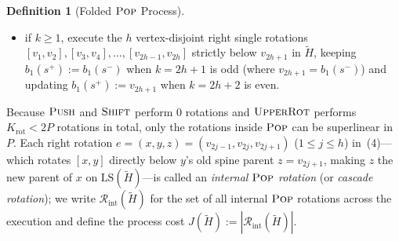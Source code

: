 \documentclass[11pt]{article}
\theoremstyle{definition}
\newtheorem{definition}[theorem]{Definition}
\theoremstyle{remark}
\newcommand{\LS}{\mathrm{LS}}
\newcommand{\PUSH}{\textnormal{\scshape Push}}
\newcommand{\POP}{\textnormal{\scshape Pop}}
\newcommand{\SHIFT}{\textnormal{\scshape Shift}}
\newcommand{\UPROT}{\textnormal{\scshape UpperRot}}
\begin{document}
\begin{definition}[Folded $\POP$ Process]
\begin{enumerate}[label=(\arabic*), leftmargin=2em, itemsep=2pt]
\begin{itemize}[leftmargin=1.5em, itemsep=1pt, topsep=2pt]
    \item if $k \ge 1$, execute the $h$ vertex-disjoint right single rotations $[v_1, v_2], [v_3, v_4], \dots, [v_{2h-1}, v_{2h}]$ strictly below $v_{2h+1}$ in $\widetilde{H}$, keeping $b_1(s^+) := b_1(s^-)$ when $k = 2h + 1$ is odd (where $v_{2h+1} = b_1(s^-)$) and updating $b_1(s^+) := v_{2h+1}$ when $k = 2h + 2$ is even.
  \end{itemize}
\end{enumerate}
Because $\PUSH$ and $\SHIFT$ perform $0$ rotations and $\UPROT$ performs $K_{\mathrm{rot}} < 2P$ rotations in total, only the rotations inside $\POP$ can be superlinear in $P$. Each right rotation $e = (x, y, z) = (v_{2j-1}, v_{2j}, v_{2j+1})$ ($1 \le j \le h$) in~(4)---which rotates $[x, y]$ directly below $y$'s old spine parent $z = v_{2j+1}$, making $z$ the new parent of $x$ on $\LS(\widetilde{H})$---is called an \emph{internal $\POP$ rotation} (or \emph{cascade rotation}); we write $\mathcal{R}_{\mathrm{int}}(\widetilde{H})$ for the set of all internal $\POP$ rotations across the execution and define the process cost $J(\widetilde{H}) := |\mathcal{R}_{\mathrm{int}}(\widetilde{H})|$.
\end{definition}
\end{document}
